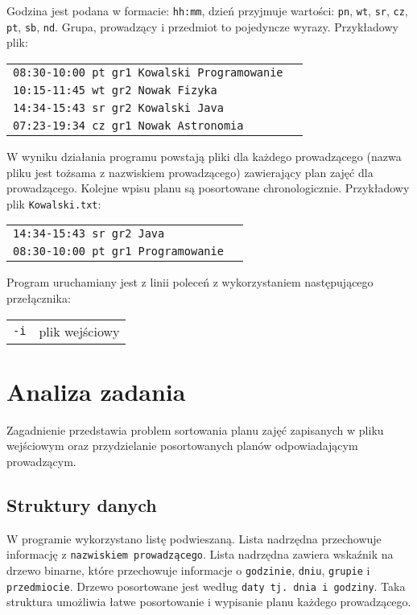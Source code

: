 \documentclass[12pt,a4paper,oneside]{article}
\let\oldmarginpar\marginpar
\renewcommand\marginpar[1]{%
  {\linespread{0.85}\normalfont\scriptsize%
\oldmarginpar[\hspace{1cm}\begin{minipage}{3cm}\raggedleft\scriptsize\color{black}\textsf{#1}\end{minipage}]%
{\hspace{0cm}\begin{minipage}{3cm}\raggedright\scriptsize\color{black}\textsf{#1}\end{minipage}}%
}%
}
\begin{document}
\noindent Godzina jest podana w formacie: \texttt{hh:mm}, dzień przyjmuje wartości: \texttt{pn}, \texttt{wt}, \texttt{sr}, \texttt{cz}, \texttt{pt}, \texttt{sb}, \texttt{nd}. Grupa,
prowadzący i przedmiot to pojedyncze wyrazy. Przykładowy plik: \newline

\begin{tabular}{ll}
\texttt{08:30-10:00 pt gr1 Kowalski Programowanie} \\
\texttt{10:15-11:45 wt gr2 Nowak Fizyka} \\
\texttt{14:34-15:43 sr gr2 Kowalski Java} \\
\texttt{07:23-19:34 cz gr1 Nowak Astronomia} \\
\end{tabular} \newline

\noindent W wyniku działania programu powstają pliki dla każdego prowadzącego (nazwa pliku jest tożsama z
nazwiskiem prowadzącego) zawierający plan zajęć dla prowadzącego. Kolejne wpisu planu są posortowane chronologicznie. Przykładowy plik \texttt{Kowalski.txt}: \newline

\begin{tabular}{ll}
\texttt{14:34-15:43 sr gr2 Java} \\
\texttt{08:30-10:00 pt gr1 Programowanie} \\
\end{tabular} \newline

Program uruchamiany jest z linii poleceń z wykorzystaniem następującego przełącznika: \\
\begin{tabular}{ll}
\indent \texttt{-i} & plik wejściowy \\
\end{tabular}

\section{Analiza zadania}
\marginpar{}

Zagadnienie przedstawia problem sortowania planu zajęć zapisanych w pliku wejściowym oraz przydzielanie posortowanych planów odpowiadającym prowadzącym.

\subsection{Struktury danych}
\marginpar{}
W programie wykorzystano listę podwieszaną. Lista nadrzędna przechowuje informację z \texttt{nazwiskiem prowadzącego}. Lista nadrzędna zawiera wskaźnik na drzewo binarne, które przechowuje informacje o \texttt{godzinie}, \texttt{dniu}, \texttt{grupie} i \texttt{przedmiocie}. Drzewo posortowane jest według \texttt{daty tj. dnia i godziny}. Taka struktura umożliwia łatwe posortowanie i wypisanie planu każdego prowadzącego.
\end{document}
